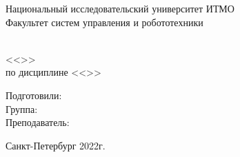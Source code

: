 \thispagestyle{empty}
\begin{center}
    Национальный исследовательский университет ИТМО\\
    Факультет систем управления и робототехники
    \vskip 7cm

    \Huge \workType                         \\
    \huge <<\workName>>                     \\
    \Large по дисциплине <<\subjectName>>   \\
    \large \workOption
\end{center}
\vfill

\begin{flushright}
    Подготовили: \authorName         \\
    Группа: \groupNumber            \\
    Преподаватель: \teacherName     \\
\end{flushright}
\vskip 2cm

\begin{center}
    Санкт-Петербург 2022г.
\end{center}
\newpage